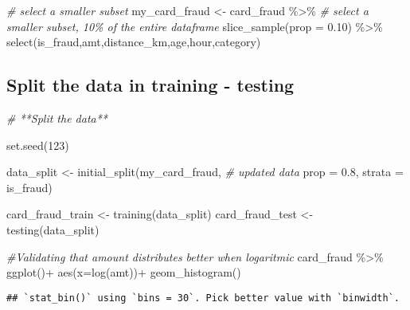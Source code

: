 \documentclass[
]{article}
\newenvironment{Shaded}{\begin{snugshade}}{\end{snugshade}}
\newcommand{\AttributeTok}[1]{\textcolor[rgb]{0.77,0.63,0.00}{#1}}
\newcommand{\CommentTok}[1]{\textcolor[rgb]{0.56,0.35,0.01}{\textit{#1}}}
\newcommand{\DecValTok}[1]{\textcolor[rgb]{0.00,0.00,0.81}{#1}}
\newcommand{\FloatTok}[1]{\textcolor[rgb]{0.00,0.00,0.81}{#1}}
\newcommand{\FunctionTok}[1]{\textcolor[rgb]{0.00,0.00,0.00}{#1}}
\newcommand{\NormalTok}[1]{#1}
\newcommand{\OtherTok}[1]{\textcolor[rgb]{0.56,0.35,0.01}{#1}}
\newcommand{\SpecialCharTok}[1]{\textcolor[rgb]{0.00,0.00,0.00}{#1}}
\begin{document}
\begin{Shaded}
\begin{Highlighting}[]
\CommentTok{\# select a smaller subset}
\NormalTok{my\_card\_fraud }\OtherTok{\textless{}{-}}\NormalTok{ card\_fraud }\SpecialCharTok{\%\textgreater{}\%} 
  \CommentTok{\# select a smaller subset, 10\% of the entire dataframe }
  \FunctionTok{slice\_sample}\NormalTok{(}\AttributeTok{prop =} \FloatTok{0.10}\NormalTok{) }\SpecialCharTok{\%\textgreater{}\%} 
  \FunctionTok{select}\NormalTok{(is\_fraud,amt,distance\_km,age,hour,category)}
\end{Highlighting}
\end{Shaded}

\hypertarget{split-the-data-in-training---testing}{%
\subsection{Split the data in training -
testing}\label{split-the-data-in-training---testing}}

\begin{Shaded}
\begin{Highlighting}[]
\CommentTok{\# **Split the data**}

\FunctionTok{set.seed}\NormalTok{(}\DecValTok{123}\NormalTok{)}

\NormalTok{data\_split }\OtherTok{\textless{}{-}} \FunctionTok{initial\_split}\NormalTok{(my\_card\_fraud, }\CommentTok{\# updated data}
                           \AttributeTok{prop =} \FloatTok{0.8}\NormalTok{, }
                           \AttributeTok{strata =}\NormalTok{ is\_fraud)}

\NormalTok{card\_fraud\_train }\OtherTok{\textless{}{-}} \FunctionTok{training}\NormalTok{(data\_split) }
\NormalTok{card\_fraud\_test }\OtherTok{\textless{}{-}} \FunctionTok{testing}\NormalTok{(data\_split)}

\CommentTok{\#Validating that amount distributes better when logaritmic}
\NormalTok{card\_fraud }\SpecialCharTok{\%\textgreater{}\%} 
  \FunctionTok{ggplot}\NormalTok{()}\SpecialCharTok{+}
  \FunctionTok{aes}\NormalTok{(}\AttributeTok{x=}\FunctionTok{log}\NormalTok{(amt))}\SpecialCharTok{+}
  \FunctionTok{geom\_histogram}\NormalTok{()}
\end{Highlighting}
\end{Shaded}

\begin{verbatim}
## `stat_bin()` using `bins = 30`. Pick better value with `binwidth`.
\end{verbatim}
\end{document}
